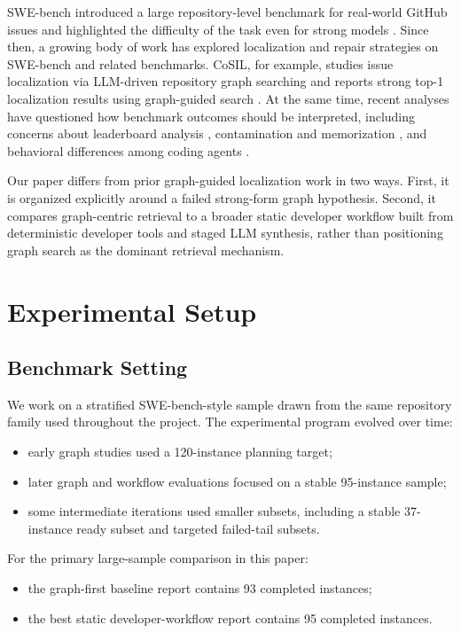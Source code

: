 \documentclass[11pt]{article}
\begin{document}
SWE-bench introduced a large repository-level benchmark for real-world GitHub issues and highlighted the difficulty of the task even for strong models \citep{jimenez2023swebench}. Since then, a growing body of work has explored localization and repair strategies on SWE-bench and related benchmarks. CoSIL, for example, studies issue localization via LLM-driven repository graph searching and reports strong top-1 localization results using graph-guided search \citep{jiang2025cosil}. At the same time, recent analyses have questioned how benchmark outcomes should be interpreted, including concerns about leaderboard analysis \citep{martinez2025dissecting}, contamination and memorization \citep{liang2025illusion}, and behavioral differences among coding agents \citep{mehtiyev2026beyond}.

Our paper differs from prior graph-guided localization work in two ways. First, it is organized explicitly around a failed strong-form graph hypothesis. Second, it compares graph-centric retrieval to a broader static developer workflow built from deterministic developer tools and staged LLM synthesis, rather than positioning graph search as the dominant retrieval mechanism.

\section{Experimental Setup}

\subsection{Benchmark Setting}

We work on a stratified SWE-bench-style sample drawn from the same repository family used throughout the project. The experimental program evolved over time:

\begin{itemize}
\item early graph studies used a 120-instance planning target;
\item later graph and workflow evaluations focused on a stable 95-instance sample;
\item some intermediate iterations used smaller subsets, including a stable 37-instance ready subset and targeted failed-tail subsets.
\end{itemize}

For the primary large-sample comparison in this paper:

\begin{itemize}
\item the graph-first baseline report contains 93 completed instances;
\item the best static developer-workflow report contains 95 completed instances.
\end{itemize}
\end{document}
